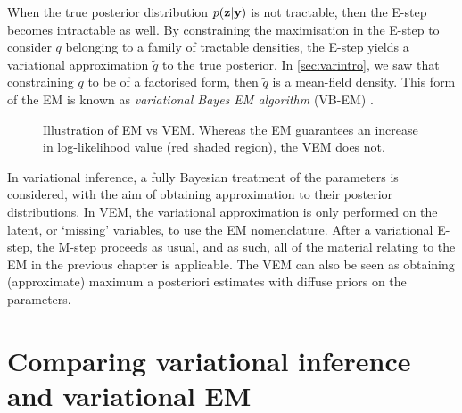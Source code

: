When the true posterior distribution $p({\mathbf z}|{\mathbf y})$ is not tractable, then the E-step becomes intractable as well.
By constraining the maximisation in the E-step to consider $q$ belonging to a family of tractable densities, the E-step yields a variational approximation $\tilde q$ to the true posterior.
In \cref{sec:varintro}, we saw that constraining $q$ to be of a factorised form, then $\tilde q$ is a mean-field density.
This form of the EM is known as \emph{variational Bayes EM algorithm} (VB-EM) \citep{beal2003}.

\begin{figure}[p]
  \centering
  \energyemEstep \hspace{0.5cm}
  \energyvbEstep
  \energyemMstep \hspace{0.5cm}
  \energyvbMstepa
  \energyemMstepfade \hspace{0.5cm}
  \energyvbMstepb
  \energyemMstepfade \hspace{0.5cm}
  \energyvbMstepc
  \vspace{-1em} 
  \caption{Illustration of EM vs VEM. Whereas the EM guarantees an increase in log-likelihood value (red shaded region), the VEM does not.}
\end{figure}

In variational inference, a fully Bayesian treatment of the parameters is considered, with the aim of obtaining approximation to their posterior distributions.
In VEM, the variational approximation is only performed on the latent, or `missing' variables, to use the EM nomenclature.
After a variational E-step, the M-step proceeds as usual, and as such, all of the material relating to the EM in the previous chapter is applicable.
The VEM can also be seen as obtaining (approximate) maximum a posteriori estimates with diffuse priors on the parameters.

\section{Comparing variational inference and variational EM}

